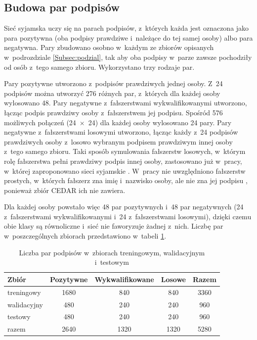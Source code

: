 \documentclass[12pt, twoside, openright]{article}
\begin{document}
\subsection{Budowa par podpisów}
\label{Subsec:pary}

Sieć syjamska uczy się na parach podpisów, z~których każda jest oznaczona jako para pozytywna (oba podpisy prawdziwe i~należące do tej samej osoby) albo para negatywna.
Pary zbudowano osobno w~każdym ze zbiorów opisanych w~podrozdziale \ref{Subsec:podzial}, tak aby oba podpisy w~parze zawsze pochodziły od osób z~tego samego zbioru.
Wykorzystano trzy rodzaje par.

Pary pozytywne utworzono z~podpisów prawdziwych jednej osoby.
Z~24 podpisów można utworzyć 276 różnych par, z~których dla każdej osoby wylosowano 48.
Pary negatywne z~fałszerstwami wykwalifikowanymi utworzono, łącząc podpis prawdziwy osoby z~fałszerstwem jej podpisu.
Spośród 576 możliwych połączeń (24~$\times$~24) dla każdej osoby wylosowano 24 pary.
Pary negatywne z~fałszerstwami losowymi utworzono, łącząc każdy z~24 podpisów prawdziwych osoby z~losowo wybranym podpisem prawdziwym innej osoby z~tego samego zbioru.
Taki sposób symulowania fałszerstw losowych, w~którym rolę fałszerstwa pełni prawdziwy podpis innej osoby, zastosowano już w~pracy, w~której zaproponowano sieci syjamskie \cite{bromley1993}.
W~pracy nie uwzględniono fałszerstw prostych, w~których fałszerz zna imię i~nazwisko osoby, ale nie zna jej podpisu \cite{hafemann2017review}, ponieważ zbiór CEDAR ich nie zawiera.

Dla każdej osoby powstało więc 48 par pozytywnych i~48 par negatywnych (24 z~fałszerstwami wykwalifikowanymi i~24 z~fałszerstwami losowymi), dzięki czemu obie klasy są równoliczne i~sieć nie faworyzuje żadnej z~nich.
Liczbę par w~poszczególnych zbiorach przedstawiono w~tabeli \ref{Tab:pary}.

\begin{table}[ht]
\caption{Liczba par podpisów w~zbiorach treningowym, walidacyjnym i~testowym}
\centering
	\begin{tabular}{|l|c|c|c|c|}
		\hline
		Zbiór & Pozytywne & Wykwalifikowane & Losowe & Razem \\
		\hline
		treningowy & 1680 & 840 & 840 & 3360 \\
		walidacyjny & 480 & 240 & 240 & 960 \\
		testowy & 480 & 240 & 240 & 960 \\
		\hline
		razem & 2640 & 1320 & 1320 & 5280 \\
		\hline
	\end{tabular}
\label{Tab:pary}
\end{table}
\end{document}
